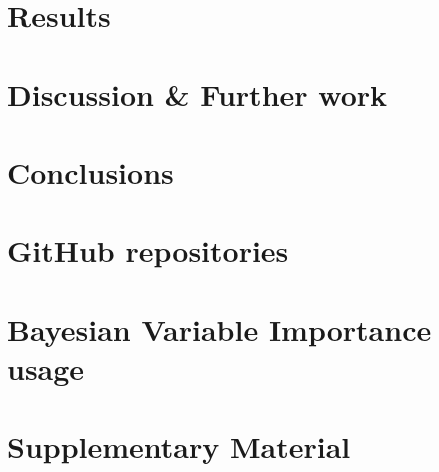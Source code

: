 \documentclass[a4paper, 12pt, openany]{book} %
\begin{document}
\chapter{Results}
\label{ch:results}

\cleardoublepage

%

%


\chapter{Discussion \& Further work}
\label{ch:discussion}

\cleardoublepage


\chapter{Conclusions}
\label{ch:conclusion}

\cleardoublepage


\cleardoublepage



\appendix
{}
\chapter{GitHub repositories}
\label{ap:github-repository}


\chapter{Bayesian Variable Importance usage}
\label{ap:bayesian-importance}


\chapter{Supplementary Material}
\label{ap:supplementary}

\end{document}
